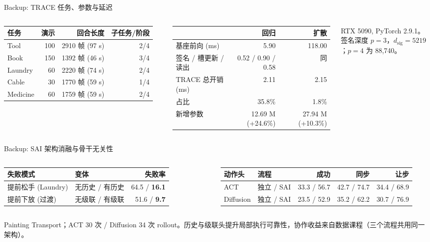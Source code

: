 \documentclass[aspectratio=169,10pt]{beamer}
\begin{document}
\begin{frame}{Backup: TRACE 任务、参数与延迟}
\begin{columns}[T]
\scriptsize
\begin{tabular}{@{}lrrr@{}}
\toprule
任务 & 演示 & 回合长度 & 子任务/阶段 \\
\midrule
Tool & 100 & 2910 帧 (97 s) & 2/4 \\
Book & 150 & 1392 帧 (46 s) & 3/4 \\
Laundry & 60 & 2220 帧 (74 s) & 2/4 \\
Cable & 30 & 1770 帧 (59 s) & 1/4 \\
Medicine & 60 & 1759 帧 (59 s) & 2/4 \\
\bottomrule
\end{tabular}
\scriptsize
\begin{tabular}{@{}lrr@{}}
\toprule
 & 回归 & 扩散 \\
\midrule
基座前向 (ms) & 5.90 & 118.00 \\
签名 / 槽更新 / 读出 & 0.52 / 0.90 / 0.58 & 同 \\
TRACE 总开销 (ms) & 2.11 & 2.15 \\
占比 & 35.8\% & 1.8\% \\
新增参数 & 12.69 M (+24.6\%) & 27.94 M (+10.3\%) \\
\bottomrule
\end{tabular}
\vspace{4pt}
{\scriptsize RTX 5090, PyTorch 2.9.1。签名深度 $p=3$，$d_{\text{sig}}=5219$；$p=4$ 为 88{,}740。}
\end{columns}
\end{frame}

\begin{frame}{Backup: SAI 架构消融与骨干无关性}
\begin{columns}[T]
\scriptsize
\begin{tabular}{@{}llr@{}}
\toprule
失败模式 & 变体 & 失败率 \\
\midrule
提前松手 (Laundry) & 无历史 / 有历史 & 64.5 / \textbf{16.1} \\
提前下放 (过渡) & 无级联 / 有级联 & 51.6 / \textbf{9.7} \\
\bottomrule
\end{tabular}
\scriptsize
\begin{tabular}{@{}llrrr@{}}
\toprule
动作头 & 流程 & 成功 & 同步 & 让步 \\
\midrule
ACT & 独立 / SAI & 33.3 / 56.7 & 42.7 / 74.7 & 34.4 / 68.9 \\
Diffusion & 独立 / SAI & 23.5 / 52.9 & 35.2 / 62.2 & 30.7 / 76.9 \\
\bottomrule
\end{tabular}
\end{columns}
\vspace{6pt}
{\small Painting Transport；ACT 30 次 / Diffusion 34 次 rollout。历史与级联头提升局部执行可靠性，协作收益来自数据课程（三个流程共用同一架构）。}
\end{frame}
\end{document}
